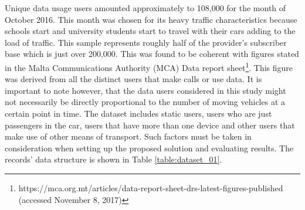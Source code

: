 \documentclass[12pt, a4paper]{report}
\theoremstyle{definition}
\theoremstyle{definition}%
\theoremstyle{definition}%
\theoremstyle{definition}%
\theoremstyle{definition}%
\theoremstyle{definition}%
\begin{document}
Unique data usage users amounted approximately to 108,000 for the month of October 2016. This month was chosen for its heavy traffic characteristics because schools start and university students start to travel with their cars adding to the load of traffic. This sample represents roughly half of the provider's subscriber base which is just over 200,000. This was found to be coherent with figures stated in the Malta Communications Authority (MCA) Data report sheet\footnote{https://mca.org.mt/articles/data-report-sheet-drs-latest-figures-published (accessed November 8, 2017)}. This figure was derived from all the distinct users that make calls or use data. It is important to note however, that the data users considered in this study might not necessarily be directly proportional to the number of moving vehicles at a certain point in time. The dataset includes static users, users who are just passengers in the car, users that have more than one device and other users that make use of other means of transport. Such factors must be taken in consideration when setting up the proposed solution and evaluating results. The records' data structure is shown in Table \ref{table:dataset_01}.


\begin{table}[h] 
    \centering
\caption{Description of data fields in the mobile usage raw dataset} 
\label{table:dataset_01}
\end{table}
\end{document}
